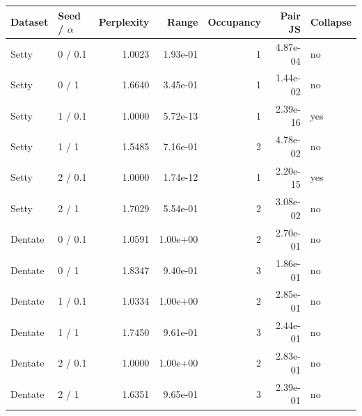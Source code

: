 \begin{tabular}{llrrrrl}
\toprule
Dataset & Seed / $\alpha$ & Perplexity & Range & Occupancy & Pair JS & Collapse \\
\midrule
Setty & 0 / 0.1 & 1.0023 & 1.93e-01 & 1 & 4.87e-04 & no \\
Setty & 0 / 1 & 1.6640 & 3.45e-01 & 1 & 1.44e-02 & no \\
Setty & 1 / 0.1 & 1.0000 & 5.72e-13 & 1 & 2.39e-16 & yes \\
Setty & 1 / 1 & 1.5485 & 7.16e-01 & 2 & 4.78e-02 & no \\
Setty & 2 / 0.1 & 1.0000 & 1.74e-12 & 1 & 2.20e-15 & yes \\
Setty & 2 / 1 & 1.7029 & 5.54e-01 & 2 & 3.08e-02 & no \\
Dentate & 0 / 0.1 & 1.0591 & 1.00e+00 & 2 & 2.70e-01 & no \\
Dentate & 0 / 1 & 1.8347 & 9.40e-01 & 3 & 1.86e-01 & no \\
Dentate & 1 / 0.1 & 1.0334 & 1.00e+00 & 2 & 2.85e-01 & no \\
Dentate & 1 / 1 & 1.7450 & 9.61e-01 & 3 & 2.44e-01 & no \\
Dentate & 2 / 0.1 & 1.0000 & 1.00e+00 & 2 & 2.83e-01 & no \\
Dentate & 2 / 1 & 1.6351 & 9.65e-01 & 3 & 2.39e-01 & no \\
\bottomrule
\end{tabular}
